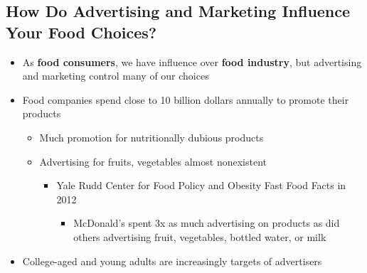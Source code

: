 \documentclass[12pt]{article}
\begin{document}
        \subsection{How Do Advertising and Marketing Influence Your Food Choices?}
            \begin{itemize}
                \item As \textbf{food consumers}, we have influence over \textbf{food industry}, but advertising and marketing control many of our choices
                \item Food companies spend close to 10 billion dollars annually to promote their products
                    \begin{itemize}
                        \item Much promotion for nutritionally dubious products
                        \item Advertising for fruits, vegetables almost nonexistent
                            \begin{itemize}
                                \item Yale Rudd Center for Food Policy and Obesity Fast Food Facts in 2012
                                    \begin{itemize}
                                        \item McDonald's spent 3x as much advertising on products as did others advertising fruit, vegetables, bottled water, or milk
                                    \end{itemize}
                            \end{itemize}
                    \end{itemize}
                \item College-aged and young adults are increasingly targets of advertisers
            \end{itemize}
\end{document}

